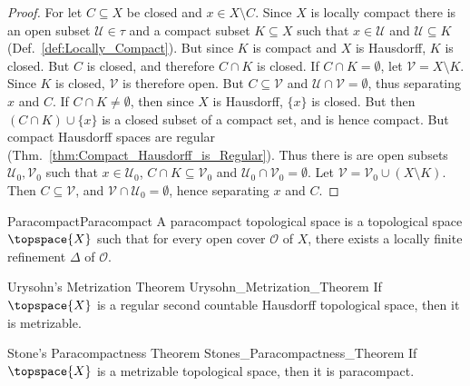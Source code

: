 \documentclass{article}                                                        %
\begin{document}
        \begin{proof}
            For let $C\subseteq{X}$ be closed and $x\in{X}\setminus{C}$. Since
            $X$ is locally compact there is an open subset
            $\mathcal{U}\in\tau$ and a compact subset $K\subseteq{X}$ such that
            $x\in\mathcal{U}$ and $\mathcal{U}\subseteq{K}$
            (Def.~\ref{def:Locally_Compact}). But since $K$ is compact and $X$
            is Hausdorff, $K$ is closed. But $C$ is closed, and therefore
            $C\cap{K}$ is closed. If $C\cap{K}=\emptyset$, let
            $\mathcal{V}=X\setminus{K}$. Since $K$ is closed,  $\mathcal{V}$ is
            therefore open. But $C\subseteq\mathcal{V}$ and
            $\mathcal{U}\cap\mathcal{V}=\emptyset$, thus separating $x$ and $C$.
            If $C\cap{K}\ne\emptyset$, then since $X$ is Hausdorff, $\{x\}$ is
            closed. But then $(C\cap{K})\cup\{x\}$ is a closed subset of a
            compact set, and is hence compact. But compact Hausdorff spaces are
            regular (Thm.~\ref{thm:Compact_Hausdorff_is_Regular}). Thus there is
            are open subsets $\mathcal{U}_{0},\mathcal{V}_{0}$ such that
            $x\in\mathcal{U}_{0}$, $C\cap{K}\subseteq\mathcal{V}_{0}$ and
            $\mathcal{U}_{0}\cap\mathcal{V}_{0}=\emptyset$.
            Let $\mathcal{V}=\mathcal{V}_{0}\cup(X\setminus{K})$. Then
            $C\subseteq\mathcal{V}$, and
            $\mathcal{V}\cap\mathcal{U}_{0}=\emptyset$, hence separating
            $x$ and $C$.
        \end{proof}
        \begin{fdefinition}{Paracompact}{Paracompact}
            A paracompact topological space is a topological space
            $\topspace{X}$ such that for every open cover $\mathcal{O}$ of $X$,
            there exists a locally finite refinement $\Delta$ of $\mathcal{O}$.
        \end{fdefinition}
        \begin{ftheorem}{Urysohn's Metrization Theorem}
                        {Urysohn_Metrization_Theorem}
            If $\topspace{X}$ is a regular second countable Hausdorff
            topological space, then it is metrizable.
        \end{ftheorem}
        \begin{ftheorem}{Stone's Paracompactness Theorem}
                        {Stones_Paracompactness_Theorem}
            If $\topspace{X}$ is a metrizable topological space, then it is
            paracompact.
        \end{ftheorem}
\end{document}
